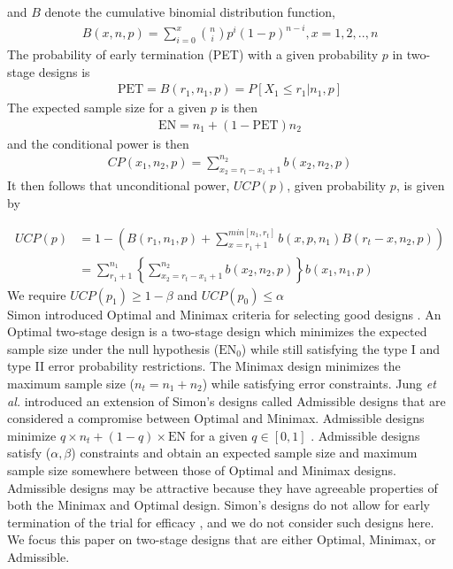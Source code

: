 \documentclass[12pt]{report}\usepackage[]{graphicx}\usepackage[]{color}
\newlength{\li}\setlength{\li}{14.48pt}
\newlength{\di}\setlength{\di}{-3.5mm}
\begin{document}
and $B$ denote the cumulative binomial distribution function, 
\begin{equation}
\begin{aligned}
B(x,n,p) = \sum_{i=0}^x {n \choose i} p^i(1-p)^{n-i}, x =  1,2,..,n
\end{aligned}
\end{equation}
The probability of early termination (PET) with a given probability $p$ in two-stage designs is 
\begin{equation}
\begin{aligned}
\mbox{PET} = B(r_1, n_1, p) = P[X_1 \leq r_1 \vert n_1, p]
\end{aligned}
\end{equation}
The expected sample size for a given $p$ is then 
\begin{equation}
\begin{aligned}
\mbox{EN} = n_1 + (1-\mbox{PET})n_2
\end{aligned}
\end{equation}
and the conditional power is then  
\begin{equation}
\begin{aligned}
CP(x_1, n_2, p) = \sum_{x_2 = r_t-x_1+1}^{n_2} b(x_2, n_2, p)
\end{aligned}
\end{equation}
It then follows that unconditional power, $UCP(p)$, given probability $p$, is given by 

\begin{equation}
\begin{aligned}
UCP(p) &= 1 - \left( B(r_1, n_1, p) + \sum_{x=r_1+1}^{min[n_1,{r_t}]} b(x, p, n_1) B(r_t-x,n_2,p) \right) \\
&= \sum_{r_1+1}^{n_1} \left\{\sum_{x_2 = r_t-x_1+1}^{n_2} b(x_2, n_2, p) \right\} b(x_1, n_1, p)
\end{aligned}
\end{equation}
We require $UCP(p_1) \geq 1-\beta$ and $UCP(p_0) \leq \alpha$ \\


\indent Simon introduced Optimal and Minimax criteria for selecting good designs \cite{Simon}. An Optimal two-stage design is a two-stage design which minimizes the expected sample size under the null hypothesis ($\mbox{EN}_0$) while still satisfying the type I and type II error probability restrictions. The Minimax design minimizes the maximum sample size ($n_t = n_1 + n_2$) while satisfying error constraints. Jung \textit{et al.} \cite{Jung} introduced an extension of Simon's designs called Admissible designs that are considered a compromise between Optimal and Minimax. Admissible designs minimize $q \times n_t + (1-q) \times \mbox{EN}$ for a given $q \in [0,1]$ \cite{Jung}. Admissible designs satisfy ($\alpha, \beta$) constraints and obtain an expected sample size and maximum sample size somewhere between those of Optimal and Minimax designs. Admissible designs may be attractive because they have agreeable properties of both the Minimax and Optimal design.  Simon's designs do not allow for early termination of the trial for efficacy \cite{Simon}, and we do not consider such designs here. We focus this paper on two-stage designs that are either Optimal, Minimax, or Admissible. 
\end{document}
